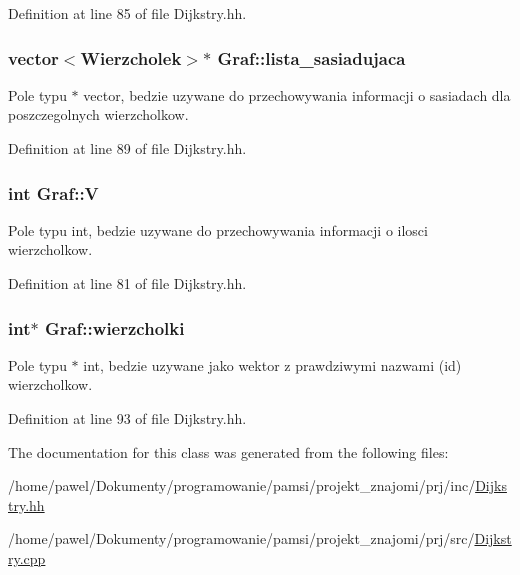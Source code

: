 Definition at line 85 of file Dijkstry.\-hh.

\hypertarget{class_graf_adf576dd4fd3cb35f4328a66befaa9c7a}{
\subsubsection[{lista\-\_\-sasiadujaca}]{\setlength{\rightskip}{0pt plus 5cm}vector$<${\bf Wierzcholek}$>$$\ast$ Graf\-::lista\-\_\-sasiadujaca}}\label{class_graf_adf576dd4fd3cb35f4328a66befaa9c7a}


Pole typu $\ast$ vector, bedzie uzywane do przechowywania informacji o sasiadach dla poszczegolnych wierzcholkow. 



Definition at line 89 of file Dijkstry.\-hh.

\hypertarget{class_graf_a673185b62d4c232bcbbc0200e95e7481}{
\subsubsection[{V}]{\setlength{\rightskip}{0pt plus 5cm}int Graf\-::\-V}}\label{class_graf_a673185b62d4c232bcbbc0200e95e7481}


Pole typu int, bedzie uzywane do przechowywania informacji o ilosci wierzcholkow. 



Definition at line 81 of file Dijkstry.\-hh.

\hypertarget{class_graf_a2df9c551c0ed169e20bdfe06aba56558}{
\subsubsection[{wierzcholki}]{\setlength{\rightskip}{0pt plus 5cm}int$\ast$ Graf\-::wierzcholki}}\label{class_graf_a2df9c551c0ed169e20bdfe06aba56558}


Pole typu $\ast$ int, bedzie uzywane jako wektor z prawdziwymi nazwami (id) wierzcholkow. 



Definition at line 93 of file Dijkstry.\-hh.



The documentation for this class was generated from the following files\-:\begin{DoxyCompactItemize}
\item 
/home/pawel/\-Dokumenty/programowanie/pamsi/projekt\-\_\-znajomi/prj/inc/\hyperlink{_dijkstry_8hh}{Dijkstry.\-hh}\item 
/home/pawel/\-Dokumenty/programowanie/pamsi/projekt\-\_\-znajomi/prj/src/\hyperlink{_dijkstry_8cpp}{Dijkstry.\-cpp}\end{DoxyCompactItemize}
